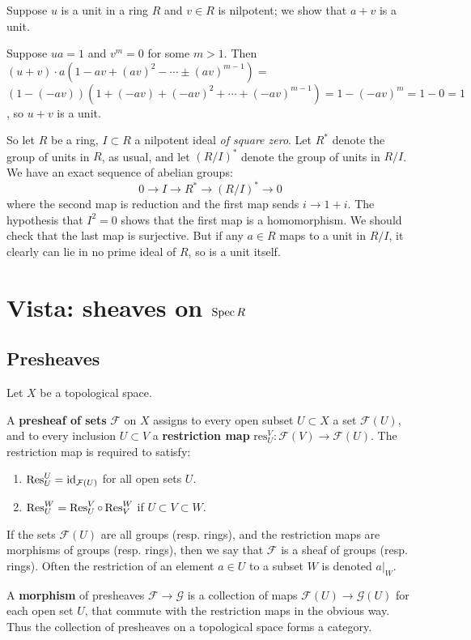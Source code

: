 \begin{example} 
Suppose $u$ is a unit in a ring $R$ and $v \in R$ is nilpotent; we show that $a+v$ is a unit.

Suppose $ua=1$ and $v^m=0$ for some
$m>1$. Then  $(u+v)\cdot a(1-av+(av)^2-\cdots\pm(av)^{m-1})=$
$(1-(-av))(1+(-av)+(-av)^2+\cdots+(-av)^{m-1})=1-(-av)^m=1-0=1$, so $u+v$
is a unit.
\end{example} 




So let $R$ be a ring, $I \subset R$ a nilpotent ideal \emph{of square zero}. 
Let $R^*$ denote the group of units in $R$, as usual, and let $(R/I)^*$ denote
the
group of units in $R/I$.
We have an exact sequence of abelian groups:
\[ 0 \to I \to R^* \to (R/I)^* \to 0  \]
where the second map is reduction and the first map sends $i \to 1+i$.
The hypothesis that $I^2 = 0$ shows that the first map is a homomorphism.
We should check that the last map is surjective. But if any $a \in R$ maps to a
unit in $R/I$, it clearly can lie in no prime ideal of $R$, so is a unit itself.
\section{Vista: sheaves on $\operatorname{Spec} R$}

\subsection{Presheaves}
Let $X$ be a topological space. 
\begin{definition} 
A \textbf{presheaf of sets} $\mathcal{F}$ on $X$ assigns to
every open subset
$U \subset X$ a set $\mathcal{F} (U)$, and to every inclusion $U
\subset V$ a
\textbf{restriction map}
$\mathrm{res}^V_U : \mathcal{F}(V) \to \mathcal{F}(U)$. The
restriction map is
required to satisfy:
\begin{enumerate}
\item $\operatorname{Res}^U_U = \operatorname{id}_{\mathcal{F}(U)} $ for all open sets $U$.
\item $\operatorname{Res}^W_U = \operatorname{Res}^V_U \circ \operatorname{Res}^W_V $ if $U \subset V
\subset W$.
\end{enumerate}

If the sets $\mathcal{F}(U)$ are all groups (resp. rings), and
the restriction
maps are morphisms of groups (resp. rings), then we say that
$\mathcal{F}$ is a
sheaf of groups (resp. rings). Often the restriction of an
element $a\in U$ to a subset $W$ is denoted $a|_W$.

A \textbf{morphism} of presheaves $\mathcal{F} \to \mathcal{G}$ is a
collection of maps $\mathcal{F}(U) \to \mathcal{G}(U)$ for each open set $U$,
that commute with the restriction maps in the obvious way. Thus the collection
of presheaves on a topological space forms a category.
\end{definition} 



